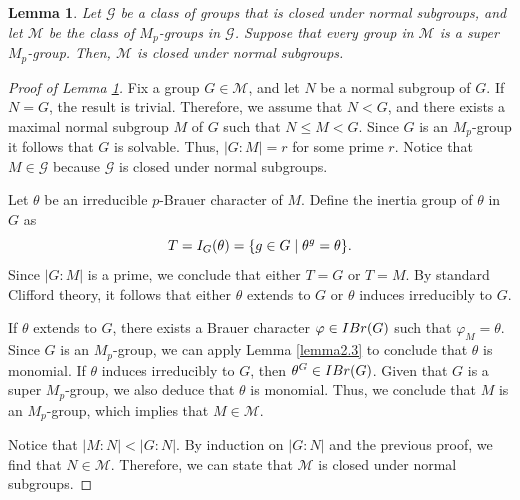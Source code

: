 \documentclass[10pt,a4paper]{amsart}
\newtheorem{lem}{Lemma}
\begin{document}
\begin{lem}\label{lemma2.4}
Let $\mathcal{G}$ be a class of groups that is closed under normal subgroups,
and let $\mathcal{M}$ be the class of $M_{p}$-groups in $\mathcal{G}$.
Suppose that every group in $\mathcal{M}$ is a super $M_{p}$-group.
Then, $\mathcal{M}$ is closed under normal subgroups.
\end{lem}

\begin{proof}[Proof of Lemma \ref{lemma2.4}]
Fix a group $G\in \mathcal{M}$, and let $N$ be a normal subgroup of $G$.
If $N=G$, the result is trivial. Therefore, we assume that $N<G$,
and there exists a maximal normal subgroup $M$ of $G$ such that $N\leq M<G$.
Since $G$ is an $M_{p}$-group it follows that $G$ is solvable.
Thus, $|G: M|=r$ for some prime $r$.
Notice that $M\in \mathcal{G}$ because $\mathcal{G}$ is closed under normal subgroups.


Let $\theta$ be an irreducible $p$-Brauer character of $M$. Define the inertia group of $\theta$ in $G$ as
$$T={\rm I}_{G}(\theta)=\{g\in G\mid \theta^{g}=\theta\}.$$ 
Since $|G: M|$ is a prime, we conclude that either $T=G$ or $T=M$.
By standard Clifford theory, it follows that either $\theta$ extends to $G$
or $\theta$ induces irreducibly to $G$.

If $\theta$ extends to $G$,
there exists a Brauer character $\varphi\in {\rm IBr}(G)$ such that $\varphi_{M}=\theta$.
Since $G$ is an $M_{p}$-group, we can apply Lemma \ref{lemma2.3} to conclude that $\theta$ is monomial.
If $\theta$ induces irreducibly to $G$, then $\theta^{G}\in {\rm IBr}(G)$.
Given that $G$ is a super $M_{p}$-group, we also deduce that $\theta$ is monomial.
Thus, we conclude that $M$ is an $M_{p}$-group, which implies that $M\in \mathcal{M}$.

Notice that $|M: N|<|G: N|$.
By induction on $|G: N|$ and the previous proof, we find that $N\in \mathcal{M}$.
Therefore, we can state that $\mathcal{M}$ is closed under normal subgroups.
\end{proof}
\end{document}

